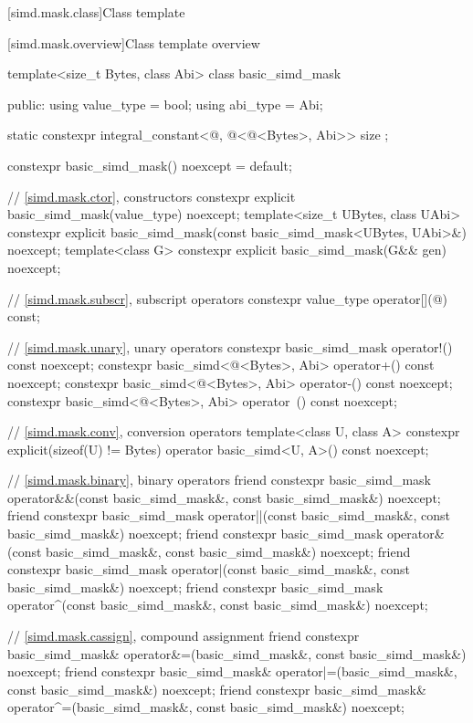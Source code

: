 [simd.mask.class]{Class template }

[simd.mask.overview]{Class template  overview}

\begin{codeblock}
template<size_t Bytes, class Abi> class basic_simd_mask {
public:
  using value_type = bool;
  using abi_type = Abi;

  static constexpr integral_constant<@\simdsizetype@, @\simdsizev@<@\integerfrom@<Bytes>, Abi>>
    size {};

  constexpr basic_simd_mask() noexcept = default;

  // \ref{simd.mask.ctor},  constructors
  constexpr explicit basic_simd_mask(value_type) noexcept;
  template<size_t UBytes, class UAbi>
    constexpr explicit basic_simd_mask(const basic_simd_mask<UBytes, UAbi>&) noexcept;
  template<class G> constexpr explicit basic_simd_mask(G&& gen) noexcept;

  // \ref{simd.mask.subscr},  subscript operators
  constexpr value_type operator[](@\simdsizetype@) const;

  // \ref{simd.mask.unary},  unary operators
  constexpr basic_simd_mask operator!() const noexcept;
  constexpr basic_simd<@\integerfrom@<Bytes>, Abi> operator+() const noexcept;
  constexpr basic_simd<@\integerfrom@<Bytes>, Abi> operator-() const noexcept;
  constexpr basic_simd<@\integerfrom@<Bytes>, Abi> operator~() const noexcept;

  // \ref{simd.mask.conv},  conversion operators
  template<class U, class A>
    constexpr explicit(sizeof(U) != Bytes) operator basic_simd<U, A>() const noexcept;

  // \ref{simd.mask.binary},  binary operators
  friend constexpr basic_simd_mask
    operator&&(const basic_simd_mask&, const basic_simd_mask&) noexcept;
  friend constexpr basic_simd_mask
    operator||(const basic_simd_mask&, const basic_simd_mask&) noexcept;
  friend constexpr basic_simd_mask
    operator&(const basic_simd_mask&, const basic_simd_mask&) noexcept;
  friend constexpr basic_simd_mask
    operator|(const basic_simd_mask&, const basic_simd_mask&) noexcept;
  friend constexpr basic_simd_mask
    operator^(const basic_simd_mask&, const basic_simd_mask&) noexcept;

  // \ref{simd.mask.cassign},  compound assignment
  friend constexpr basic_simd_mask&
    operator&=(basic_simd_mask&, const basic_simd_mask&) noexcept;
  friend constexpr basic_simd_mask&
    operator|=(basic_simd_mask&, const basic_simd_mask&) noexcept;
  friend constexpr basic_simd_mask&
    operator^=(basic_simd_mask&, const basic_simd_mask&) noexcept;

}
\end{codeblock}
